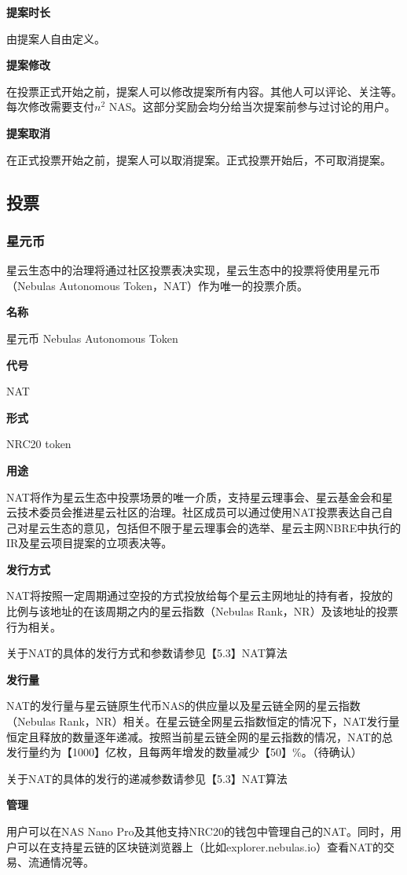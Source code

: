 \textbf{提案时长}

由提案人自由定义。

\textbf{提案修改}

在投票正式开始之前，提案人可以修改提案所有内容。其他人可以评论、关注等。每次修改需要支付$n^2$ NAS。这部分奖励会均分给当次提案前参与过讨论的用户。

\textbf{提案取消}

在正式投票开始之前，提案人可以取消提案。正式投票开始后，不可取消提案。

\subsection{投票}
\subsubsection{星元币}
星云生态中的治理将通过社区投票表决实现，星云生态中的投票将使用星元币（Nebulas Autonomous Token，NAT）作为唯一的投票介质。

\textbf{名称}
 
星元币 Nebulas Autonomous Token

\textbf{代号}

NAT

\textbf{形式}

NRC20 token

\textbf{用途}

NAT将作为星云生态中投票场景的唯一介质，支持星云理事会、星云基金会和星云技术委员会推进星云社区的治理。社区成员可以通过使用NAT投票表达自己自己对星云生态的意见，包括但不限于星云理事会的选举、星云主网NBRE中执行的IR及星云项目提案的立项表决等。

\textbf{发行方式}

NAT将按照一定周期通过空投的方式投放给每个星云主网地址的持有者，投放的比例与该地址的在该周期之内的星云指数（Nebulas Rank，NR）及该地址的投票行为相关。

关于NAT的具体的发行方式和参数请参见【5.3】NAT算法

\textbf{发行量}
	
NAT的发行量与星云链原生代币NAS的供应量以及星云链全网的星云指数（Nebulas Rank，NR）相关。在星云链全网星云指数恒定的情况下，NAT发行量恒定且释放的数量逐年递减。按照当前星云链全网的星云指数的情况，NAT的总发行量约为【1000】亿枚，且每两年增发的数量减少【50】\%。（待确认）

关于NAT的具体的发行的递减参数请参见【5.3】NAT算法

\textbf{管理}

用户可以在NAS Nano Pro及其他支持NRC20的钱包中管理自己的NAT。同时，用户可以在支持星云链的区块链浏览器上（比如explorer.nebulas.io）查看NAT的交易、流通情况等。

